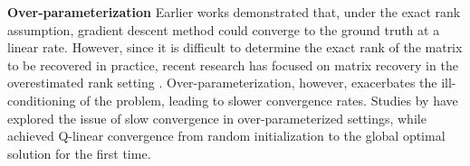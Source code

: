 

\textbf{Over-parameterization} Earlier works \cite{tu2016low,tong2021accelerating,chen2015fast,li2018algorithmic} demonstrated that, under the exact rank assumption, gradient descent method could converge to the ground truth at a linear rate. However, since it is difficult to determine the exact rank of the matrix to be recovered in practice, recent research has focused on matrix recovery in the overestimated rank setting \cite{zhuo2024computational,li2018algorithmic,stoger2021small,soltanolkotabi2023implicit}. Over-parameterization, however, exacerbates the ill-conditioning of the problem, leading to slower convergence rates. Studies by \cite{zhang2021preconditioned,zhang2023preconditioned,xu2023power,cheng2024accelerating,jia2024globally} have explored the issue of slow convergence in over-parameterized settings, while \cite{jia2024globally} achieved Q-linear convergence from random initialization to the global optimal solution for the first time.



